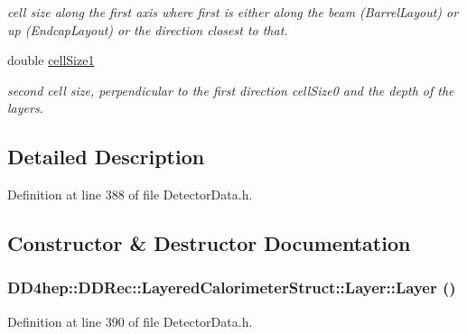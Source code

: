 \begin{DoxyCompactItemize}
\begin{DoxyCompactList}\small\item\em cell size along the first axis where first is either along the beam (BarrelLayout) or up (EndcapLayout) or the direction closest to that. \item\end{DoxyCompactList}\item 
double \hyperlink{struct_d_d4hep_1_1_d_d_rec_1_1_layered_calorimeter_struct_1_1_layer_afbf7fe6d692de53e93a654dbdd8a866a}{cellSize1}
\begin{DoxyCompactList}\small\item\em second cell size, perpendicular to the first direction cellSize0 and the depth of the layers. \item\end{DoxyCompactList}\end{DoxyCompactItemize}


\subsection{Detailed Description}


Definition at line 388 of file DetectorData.h.

\subsection{Constructor \& Destructor Documentation}
\hypertarget{struct_d_d4hep_1_1_d_d_rec_1_1_layered_calorimeter_struct_1_1_layer_ad13df3e5858587a746ce2d5029341010}{
\subsubsection[{Layer}]{\setlength{\rightskip}{0pt plus 5cm}DD4hep::DDRec::LayeredCalorimeterStruct::Layer::Layer ()}}
\label{struct_d_d4hep_1_1_d_d_rec_1_1_layered_calorimeter_struct_1_1_layer_ad13df3e5858587a746ce2d5029341010}


Definition at line 390 of file DetectorData.h.

